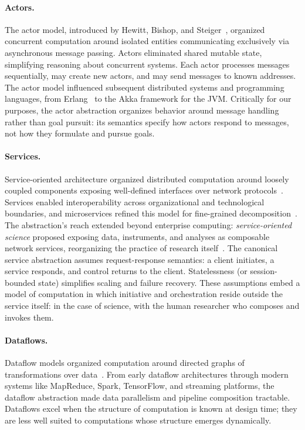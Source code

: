 \documentclass[11pt]{article}
\begin{document}
\paragraph{Actors.}
The actor model, introduced by Hewitt, Bishop, and Steiger~\cite{hewitt_actors}, organized concurrent computation around isolated entities communicating exclusively via asynchronous message passing. Actors eliminated shared mutable state, simplifying reasoning about concurrent systems. Each actor processes messages sequentially, may create new actors, and may send messages to known addresses. 
The actor model influenced subsequent distributed systems and programming languages, from Erlang~\cite{armstrong_erlang} to the Akka framework for the JVM.
Critically for our purposes, the actor abstraction organizes behavior around message handling rather than goal pursuit: its semantics specify how actors respond to messages, not how they formulate and pursue goals.

\paragraph{Services.}
Service-oriented architecture organized distributed computation around loosely coupled components exposing well-defined interfaces over network protocols~\cite{erl_soa}. Services enabled interoperability across organizational and technological boundaries, and microservices refined this model for fine-grained decomposition~\cite{newman_microservices}. The abstraction's reach extended beyond enterprise computing: \textit{service-oriented science} proposed exposing data, instruments, and analyses as composable network services, reorganizing the practice of research itself~\cite{foster_sos}. The canonical service abstraction assumes request-response semantics: a client initiates, a service responds, and control returns to the client. Statelessness (or session-bounded state) simplifies scaling and failure recovery. These assumptions embed a model of computation in which initiative and orchestration reside outside the service itself: in the case of science, with the human researcher who composes and invokes them.

\paragraph{Dataflows.}
Dataflow models organized computation around directed graphs of transformations over data~\cite{johnston_dataflow}. From early dataflow architectures through modern systems like MapReduce, Spark, TensorFlow, and streaming platforms, the dataflow abstraction made data parallelism and pipeline composition tractable. Dataflows excel when the structure of computation is known at design time; they are less well suited to computations whose structure emerges dynamically.
\end{document}
